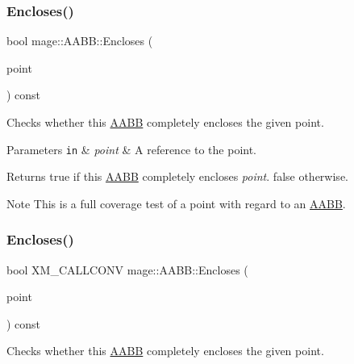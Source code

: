\subsubsection{\texorpdfstring{Encloses()}{Encloses()}\hspace{0.1cm}{\footnotesize\ttfamily [1/4]}}
{\footnotesize\ttfamily bool mage\+::\+A\+A\+B\+B\+::\+Encloses (\begin{DoxyParamCaption}\item[{const \hyperlink{structmage_1_1_point3}{Point3} \&}]{point }\end{DoxyParamCaption}) const\hspace{0.3cm}{\ttfamily [noexcept]}}

Checks whether this \hyperlink{classmage_1_1_a_a_b_b}{A\+A\+BB} completely encloses the given point.


\begin{DoxyParams}[1]{Parameters}
\mbox{\tt in}  & {\em point} & A reference to the point. \\
\hline
\end{DoxyParams}
\begin{DoxyReturn}{Returns}
{\ttfamily true} if this \hyperlink{classmage_1_1_a_a_b_b}{A\+A\+BB} completely encloses {\itshape point}. {\ttfamily false} otherwise. 
\end{DoxyReturn}
\begin{DoxyNote}{Note}
This is a full coverage test of a point with regard to an \hyperlink{classmage_1_1_a_a_b_b}{A\+A\+BB}. 
\end{DoxyNote}
\hypertarget{classmage_1_1_a_a_b_b_a97e3f57fc91e4fea04572382c94f4279}{}\label{classmage_1_1_a_a_b_b_a97e3f57fc91e4fea04572382c94f4279} 
\subsubsection{\texorpdfstring{Encloses()}{Encloses()}\hspace{0.1cm}{\footnotesize\ttfamily [2/4]}}
{\footnotesize\ttfamily bool X\+M\+\_\+\+C\+A\+L\+L\+C\+O\+NV mage\+::\+A\+A\+B\+B\+::\+Encloses (\begin{DoxyParamCaption}\item[{F\+X\+M\+V\+E\+C\+T\+OR}]{point }\end{DoxyParamCaption}) const\hspace{0.3cm}{\ttfamily [noexcept]}}

Checks whether this \hyperlink{classmage_1_1_a_a_b_b}{A\+A\+BB} completely encloses the given point.


